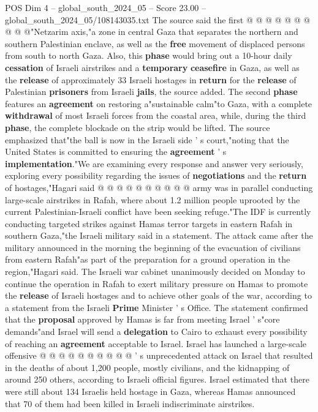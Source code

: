 \begin{textsample}{POS Dim 4 – global\_south\_2024\_05 – Score 23.00 – global\_south\_2024\_05/108143035.txt}
The source said the first @ @ @ @ @ @ @ @ @ @"Netzarim axis,"a zone in central Gaza that separates the northern and southern Palestinian enclave, as well as the \textbf{free} movement of displaced persons from south to north Gaza.
Also, this \textbf{phase} would bring out a 10-hour daily \textbf{cessation} of Israeli airstrikes and a \textbf{temporary} \textbf{ceasefire} in Gaza, as well as the \textbf{release} of approximately 33 Israeli hostages in \textbf{return} for the \textbf{release} of Palestinian \textbf{prisoners} from Israeli \textbf{jails}, the source added.
The second \textbf{phase} features an \textbf{agreement} on restoring a"sustainable calm"to Gaza, with a complete \textbf{withdrawal} of most Israeli forces from the coastal area, while, during the third \textbf{phase}, the complete blockade on the strip would be lifted.
The source emphasized that"the ball is now in the Israeli side ' s court,"noting that the United States is committed to ensuring the \textbf{agreement} ' s \textbf{implementation}."We are examining every response and answer very seriously, exploring every possibility regarding the issues of \textbf{negotiations} and the \textbf{return} of hostages,"Hagari said @ @ @ @ @ @ @ @ @ @ army was in parallel conducting large-scale airstrikes in Rafah, where about 1.2 million people uprooted by the current Palestinian-Israeli conflict have been seeking refuge."The IDF is currently conducting targeted strikes against Hamas terror targets in eastern Rafah in southern Gaza,"the Israeli military said in a statement.
The attack came after the military announced in the morning the beginning of the evacuation of civilians from eastern Rafah"as part of the preparation for a ground operation in the region,"Hagari said.
The Israeli war cabinet unanimously decided on Monday to continue the operation in Rafah to exert military pressure on Hamas to promote the \textbf{release} of Israeli hostages and to achieve other goals of the war, according to a statement from the Israeli \textbf{Prime} Minister ' s Office.
The statement confirmed that the \textbf{proposal} approved by Hamas is far from meeting Israel ' s"core demands"and Israel will send a \textbf{delegation} to Cairo to exhaust every possibility of reaching an \textbf{agreement} acceptable to Israel.
Israel has launched a large-scale offensive @ @ @ @ @ @ @ @ @ @ ' s unprecedented attack on Israel that resulted in the deaths of about 1,200 people, mostly civilians, and the kidnapping of around 250 others, according to Israeli official figures.
Israel estimated that there were still about 134 Israelis held hostage in Gaza, whereas Hamas announced that 70 of them had been killed in Israeli indiscriminate airstrikes.

\end{textsample}
